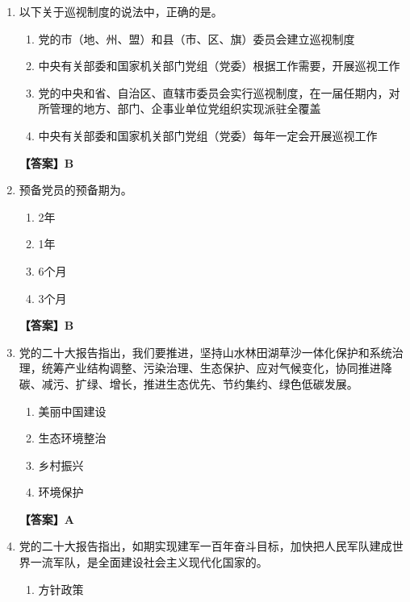 \documentclass[UTF8,11pt,a4paper]{ctexart}
\begin{document}
\begin{enumerate}[label=\textbf{\arabic*.}, leftmargin=2.5em, itemsep=0.7em]
\begin{enumerate}[label=\Alph*., leftmargin=2em, itemsep=0.1em, topsep=0.15em]
\item 忘我精神
\end{enumerate}
\textbf{【答案】A}
\item 以下关于巡视制度的说法中，正确的是\allowbreak\underline{\hspace{4em}}。
\begin{enumerate}[label=\Alph*., leftmargin=2em, itemsep=0.1em, topsep=0.15em]
\item 党的市（地、州、盟）和县（市、区、旗）委员会建立巡视制度
\item 中央有关部委和国家机关部门党组（党委）根据工作需要，开展巡视工作
\item 党的中央和省、自治区、直辖市委员会实行巡视制度，在一届任期内，对所管理的地方、部门、企事业单位党组织实现派驻全覆盖
\item 中央有关部委和国家机关部门党组（党委）每年一定会开展巡视工作
\end{enumerate}
\textbf{【答案】B}
\item 预备党员的预备期为\allowbreak\underline{\hspace{4em}}。
\begin{enumerate}[label=\Alph*., leftmargin=2em, itemsep=0.1em, topsep=0.15em]
\item 2年
\item 1年
\item 6个月
\item 3个月
\end{enumerate}
\textbf{【答案】B}
\item 党的二十大报告指出，我们要推进\allowbreak\underline{\hspace{4em}}，坚持山水林田湖草沙一体化保护和系统治理，统筹产业结构调整、污染治理、生态保护、应对气候变化，协同推进降碳、减污、扩绿、增长，推进生态优先、节约集约、绿色低碳发展。
\begin{enumerate}[label=\Alph*., leftmargin=2em, itemsep=0.1em, topsep=0.15em]
\item 美丽中国建设
\item 生态环境整治
\item 乡村振兴
\item 环境保护
\end{enumerate}
\textbf{【答案】A}
\item 党的二十大报告指出，如期实现建军一百年奋斗目标，加快把人民军队建成世界一流军队，是全面建设社会主义现代化国家的\allowbreak\underline{\hspace{4em}}。
\begin{enumerate}[label=\Alph*., leftmargin=2em, itemsep=0.1em, topsep=0.15em]
\item 方针政策

\end{enumerate}
\end{enumerate}
\end{document}
